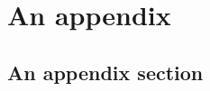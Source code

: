 \documentclass[lscape]{msu-thesis}
\begin{document}
\clearpage
\appendix   %
\chapter{An appendix}
\section{An appendix section}
\lipsum[9-15]
\backmatter
\SingleSpacing
\makebibliographypage


\end{document}
